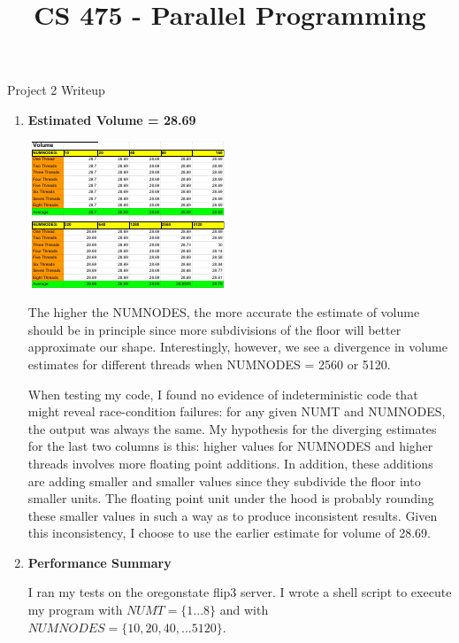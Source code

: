 \documentclass[11pt,letterpaper]{article}
\begin{document}
 \univlogo

\title{CS 475 - Parallel Programming}
{\Huge Project 2 Writeup}\\[5mm]

\begin{enumerate}
  \item \textbf{Estimated Volume = 28.69} 

    \includegraphics[width=\linewidth]{volume}
    
    The higher the NUMNODES, the more accurate the estimate of volume
    should be in principle since more subdivisions of the floor will better
    approximate our shape. Interestingly, however, we see a divergence
    in volume estimates for different threads when NUMNODES = 2560 or 5120. 
 
    When testing my code, I found no evidence of indeterministic code
    that might reveal race-condition failures: for any given NUMT and NUMNODES,
    the output was always the same. My hypothesis for the diverging estimates
    for the last two columns is this: higher values for NUMNODES and 
    higher threads involves more floating point additions. In addition, 
    these additions are adding smaller and smaller values since they subdivide
    the floor into smaller units. The floating point unit under the hood is
    probably rounding these smaller values in such a way as to produce
    inconsistent results. Given this inconsistency, I choose to use the earlier
    estimate for volume of 28.69.

  \item \textbf{Performance Summary} 

    I ran my tests on the oregonstate flip3 server. I wrote a shell script
    to execute my program with $NUMT = \{1 ... 8\}$ and with $NUMNODES = \{
      10, 20, 40, ... 5120 \}$.


\end{enumerate}
\end{document}
